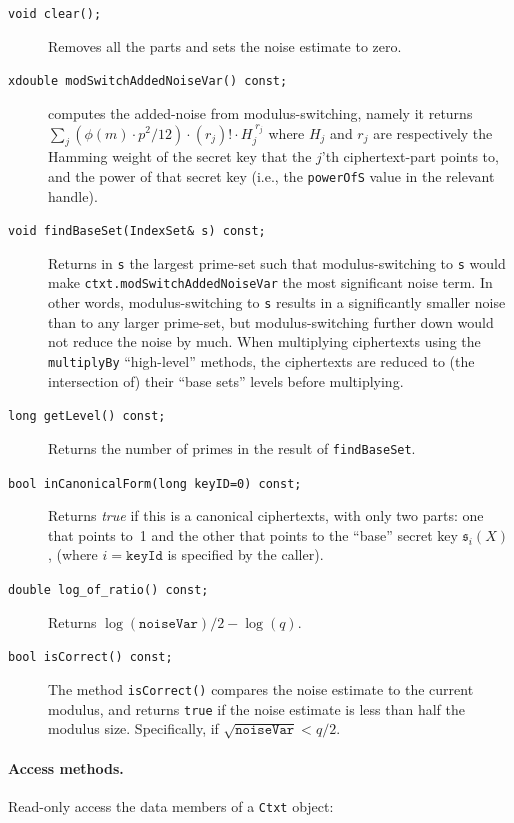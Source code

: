 \documentclass[14pt]{extarticle}
\newcommand{\sk}{\mathfrak{s}}
\begin{document}
\begin{description}
\item[\texttt{void clear();}]
Removes all the parts and sets the noise estimate to zero.

\item[\texttt{xdouble modSwitchAddedNoiseVar() const;}]
computes the added-noise from modulus-switching, namely it
returns $\sum_j (\phi(m)\cdot p^2/12)\cdot(r_j)!\cdot H_j^{\;r_j}$
where $H_j$ and $r_j$ are respectively the Hamming weight of the
secret key that the $j$'th ciphertext-part points to, and the power
of that secret key (i.e., the \texttt{powerOfS} value in the relevant
handle).

\item[\texttt{void findBaseSet(IndexSet\& s) const;}]
Returns in \texttt{s} the largest prime-set such that
modulus-switching to \texttt{s} would make
\texttt{ctxt.modSwitchAddedNoiseVar} the most significant noise
term. In other words, modulus-switching to \texttt{s} results in
a significantly smaller noise than to any larger prime-set, but
modulus-switching further down would not reduce the noise by much.
When multiplying
ciphertexts using the \texttt{multiplyBy} ``high-level'' methods,
the ciphertexts are reduced to (the intersection of) their
``base sets'' levels before multiplying.

\item[\texttt{long getLevel() const;}]
Returns the number of primes in the result of \texttt{findBaseSet}.

\item[\texttt{bool inCanonicalForm(long keyID=0) const;}]
Returns \emph{true} if this is a canonical ciphertexts, with only two
parts: one that points to~1 and the other that points to the ``base''
secret key $\sk_i(X)$, (where $i=\texttt{keyId}$ is specified by the
caller).

\item[\texttt{double log\_of\_ratio() const;}]
Returns $\log(\mathtt{noiseVar})/2 - \log(q)$.

\item[\texttt{bool isCorrect() const;}] 
The method \texttt{isCorrect()} compares the noise estimate to the
current modulus, and returns \texttt{true} if the noise estimate is
less than half the modulus size. Specifically, if
$\sqrt{\mathtt{noiseVar}}<q/2$.
\end{description}

\vspace{-3ex}
\paragraph{Access methods.}
Read-only access the data members of a \texttt{Ctxt} object:
\end{document}
